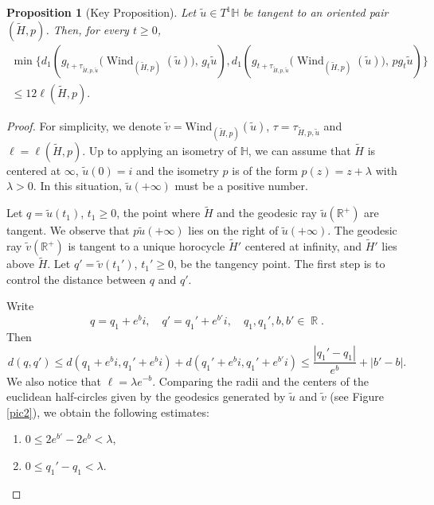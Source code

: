 \documentclass[a4paper,english,reqno]{amsart}
\DeclareMathOperator{\reals}{\mathbb{R}}
\renewcommand{\H}{\mathbb{H}}
\newtheorem{proposition}{Proposition}
\theoremstyle{definition}
\numberwithin{equation}{section}
\begin{document}
 \begin{proposition}[Key Proposition]\label{key_prop} 
 	Let $\tilde u\in T^1 \H$ be tangent to an oriented pair $(\tilde H, p)$.  	
 	Then, for every $t\ge 0$,
 	\begin{align*}
 		\min \{ d_1\!\left(g_{t+\tau_{\tilde H, p ,\tilde u}}\bigl(\operatorname{Wind}_{(\tilde H, p )}(\tilde u)\bigr),\, g_t\tilde u\right),
 		d_1\!\left(g_{t+\tau_{\tilde H, p ,\tilde u}}\bigl(\operatorname{Wind}_{(\tilde H, p )}(\tilde u)\bigr),\, p g_t\tilde u\right)
 		\}
 		\\ \le 12 \ell(\tilde H, p).
 	\end{align*}
 	
 \end{proposition}
 \begin{proof}
 	For simplicity, we denote $\tilde v=\mathrm{Wind}_{(\tilde H, p )}(\tilde u)$, $\tau=\tau_{\tilde H, p ,\tilde u}$ and $\ell = \ell (\tilde H, p)$.
 	Up to applying an isometry of $\mathbb{H}$, we can assume that $\tilde H$ is centered at $\infty$, $\tilde u(0)=i$ and the isometry $p$ is of the form $p(z)=z+\lambda$ with $\lambda>0$. In this situation, $\tilde u (+\infty)$ must be a positive number.
 	
 	Let $q=\tilde u(t_1)$, $t_1\ge 0$, the point where $\tilde H$ and the geodesic ray $\tilde u (\mathbb{R}^+)$ are tangent. We observe that $p\tilde u (+\infty )$ lies on the right of $\tilde u (+\infty)$. The geodesic ray $\tilde v (\mathbb{R}^+)$ is tangent to a unique horocycle $\tilde H'$ centered at infinity, and $\tilde H'$ lies above $\tilde H$. Let $q' = \tilde v (t_1')$, $t_1'\ge 0$, be the tangency point. The first step is to control the distance between $q$ and $q'$.
 	
 	Write
 	\[
 	q= q_1 + e^{b} i, \quad q'=q_1' +e^ {b'} i, \quad q_1,q_1', b, b'\in \reals.
 	\]
 	Then
 	\[
 	d(q,q')\le d(q_1 + e^{b} i, q_1' + e^{b} i) + d(q_1' + e^{b} i, q_1' + e^{b'} i) \le \frac{|q_1'-q_1|}{e^b} + |b'-b|.
 	\]
 	 We also notice that $\ell= \lambda e^{-b}$. Comparing the radii and the centers of the euclidean half-circles given by the geodesics generated by $\tilde u$ and $\tilde v$ (see Figure \ref{pic2}), we obtain the following estimates:
 	 \begin{enumerate}
 	 	\item $0\le 2e^{b'} -2 e^b <\lambda$,\label{eq1}
 	 	\item $0\le q_1'-q_1 <\lambda$.\label{eq2}
 	 \end{enumerate}
  


\end{proof}
\end{document}
